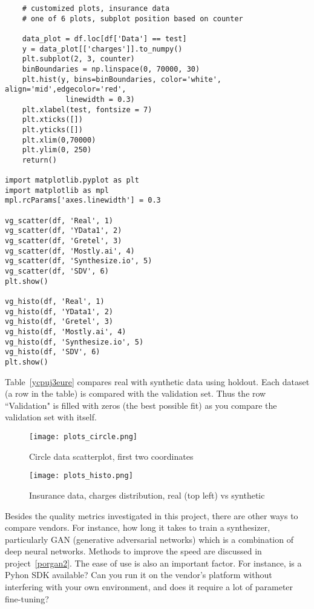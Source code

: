 \documentclass[oneside,10pt]{book}
\begin{document}
\begin{lstlisting}
    # customized plots, insurance data 
    # one of 6 plots, subplot position based on counter

    data_plot = df.loc[df['Data'] == test]
    y = data_plot[['charges']].to_numpy()
    plt.subplot(2, 3, counter)
    binBoundaries = np.linspace(0, 70000, 30)
    plt.hist(y, bins=binBoundaries, color='white', align='mid',edgecolor='red',
              linewidth = 0.3) 
    plt.xlabel(test, fontsize = 7)
    plt.xticks([])
    plt.yticks([])
    plt.xlim(0,70000)
    plt.ylim(0, 250)
    return()

import matplotlib.pyplot as plt
import matplotlib as mpl
mpl.rcParams['axes.linewidth'] = 0.3

vg_scatter(df, 'Real', 1)
vg_scatter(df, 'YData1', 2)
vg_scatter(df, 'Gretel', 3)
vg_scatter(df, 'Mostly.ai', 4)
vg_scatter(df, 'Synthesize.io', 5)
vg_scatter(df, 'SDV', 6)
plt.show()

vg_histo(df, 'Real', 1)
vg_histo(df, 'YData1', 2)
vg_histo(df, 'Gretel', 3)
vg_histo(df, 'Mostly.ai', 4)
vg_histo(df, 'Synthesize.io', 5)
vg_histo(df, 'SDV', 6)
plt.show()
\end{lstlisting}\vspace{1ex}

\noindent Table~\ref{ycpuj3eure} compares real with synthetic data using holdout. Each dataset (a row in the table) is compared with the validation set. Thus the row ``Validation" is filled with zeros (the best possible fit) as you compare the validation set with itself.


\begin{figure}[H]
\centering
\texttt{[image: plots\_circle.png]}   
\caption{Circle data scatterplot, first two coordinates}
\label{fig:gretelbwa}
\end{figure}



\begin{figure}[H]
\centering
\texttt{[image: plots\_histo.png]}   
\caption{Insurance data, charges distribution, real (top left) vs synthetic}
\label{fig:gretelgf}
\end{figure}

Besides the quality metrics investigated in this project, there are other ways to compare vendors. For instance, how long it takes to train a synthesizer, particularly GAN (generative adversarial networks) which is a combination of deep neural networks. Methods to improve the speed are discussed in project~\ref{porgan2}. The ease of use is also an important factor. For instance, is a Pyhon SDK available? Can you run it on the
 vendor's platform without interfering with your own environment, and does it require a lot of parameter fine-tuning?
\end{document}
